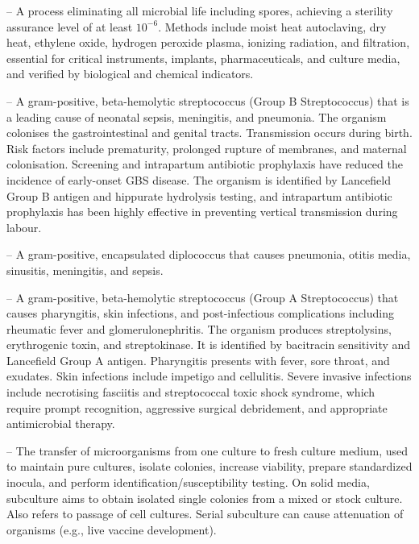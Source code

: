 -- A process eliminating all microbial life including spores, achieving a sterility assurance level of at least $10^{-6}$. Methods include moist heat autoclaving, dry heat, ethylene oxide, hydrogen peroxide plasma, ionizing radiation, and filtration, essential for critical instruments, implants, pharmaceuticals, and culture media, and verified by biological and chemical indicators.

-- A gram-positive, beta-hemolytic streptococcus (Group B Streptococcus) that is a leading cause of neonatal sepsis, meningitis, and pneumonia. The organism colonises the gastrointestinal and genital tracts. Transmission occurs during birth. Risk factors include prematurity, prolonged rupture of membranes, and maternal colonisation. Screening and intrapartum antibiotic prophylaxis have reduced the incidence of early-onset GBS disease. The organism is identified by Lancefield Group B antigen and hippurate hydrolysis testing, and intrapartum antibiotic prophylaxis has been highly effective in preventing vertical transmission during labour.

-- A gram-positive, encapsulated diplococcus that causes pneumonia, otitis media, sinusitis, meningitis, and sepsis.

-- A gram-positive, beta-hemolytic streptococcus (Group A Streptococcus) that causes pharyngitis, skin infections, and post-infectious complications including rheumatic fever and glomerulonephritis. The organism produces streptolysins, erythrogenic toxin, and streptokinase. It is identified by bacitracin sensitivity and Lancefield Group A antigen. Pharyngitis presents with fever, sore throat, and exudates. Skin infections include impetigo and cellulitis. Severe invasive infections include necrotising fasciitis and streptococcal toxic shock syndrome, which require prompt recognition, aggressive surgical debridement, and appropriate antimicrobial therapy.

-- The transfer of microorganisms from one culture to fresh culture medium, used to maintain pure cultures, isolate colonies, increase viability, prepare standardized inocula, and perform identification/susceptibility testing. On solid media, subculture aims to obtain isolated single colonies from a mixed or stock culture. Also refers to passage of cell cultures. Serial subculture can cause attenuation of organisms (e.g., live vaccine development).

